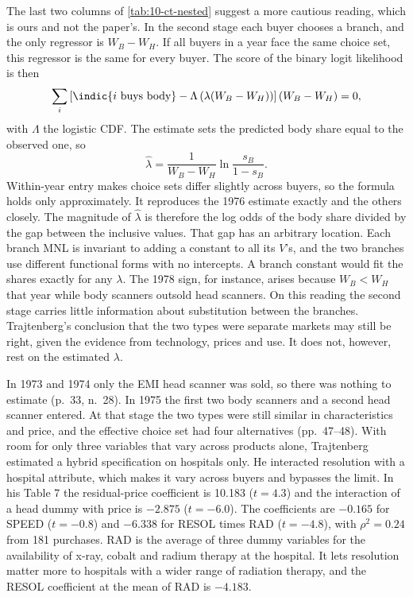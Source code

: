 The last two columns of \cref{tab:10-ct-nested} suggest a more cautious reading, which is ours and not the paper's.
In the second stage each buyer chooses a branch, and the only regressor is $W_B - W_H$. If all buyers in a year face
the same choice set, this regressor is the same for every buyer. The score of the binary logit likelihood is then
\begin{equation*}
\sum_i\left[\indic\{i\text{ buys body}\} - \Lambda\left(\lambda(W_B - W_H)\right)\right](W_B - W_H) = 0,
\end{equation*}
with $\Lambda$ the logistic CDF. The estimate sets the predicted body share equal to the observed one, so
\begin{equation}\label{eq:10-traj-lambda-implied}
\hat\lambda = \frac{1}{W_B - W_H}\ln\frac{s_B}{1 - s_B}.
\end{equation}
Within-year entry makes choice sets differ slightly across buyers, so the formula holds only approximately. It
reproduces the 1976 estimate exactly and the others closely. The magnitude of $\hat\lambda$ is therefore the log
odds of the body share divided by the gap between the inclusive values. That gap has an arbitrary location. Each
branch MNL is invariant to adding a constant to all its $V$'s, and the two branches use different functional forms
with no intercepts. A branch constant would fit the shares exactly for any $\lambda$. The 1978 sign, for instance,
arises because $W_B < W_H$ that year while body scanners outsold head scanners. On this reading the second stage
carries little information about substitution between the branches. Trajtenberg's conclusion that the two types
were separate markets may still be right, given the evidence from technology, prices and use. It does not, however,
rest on the estimated $\lambda$.

 In 1973 and 1974 only the EMI head scanner was sold, so there was nothing to
estimate (p.~33, n.~28). In 1975 the first two body scanners and a second head scanner entered. At that stage the
two types were still similar in characteristics and price, and the effective choice set had four alternatives
(pp.~47--48). With room for only three variables that vary across products alone, Trajtenberg estimated a hybrid
specification on hospitals only. He interacted resolution with a hospital attribute, which makes it vary across buyers
and bypasses the limit. In his Table 7 the residual-price coefficient is 10.183 ($t = 4.3$) and the interaction
of a head dummy with price is $-2.875$ ($t = -6.0$). The coefficients are $-0.165$ for SPEED ($t = -0.8$) and
$-6.338$ for RESOL times RAD ($t = -4.8$), with $\rho^2 = 0.24$ from 181 purchases. RAD is the average of three dummy variables
for the availability of x-ray, cobalt and radium therapy at the hospital. It lets resolution matter more to hospitals
with a wider range of radiation therapy, and the RESOL coefficient at the mean of RAD is $-4.183$.


